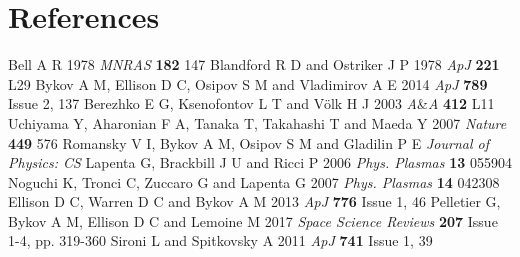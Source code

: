 \section*{References}
\begin{thebibliography}{20}
 Bell A R 1978 \textit{MNRAS} \textbf{182} 147
 Blandford R D and Ostriker J P 1978 \textit{ApJ} \textbf{221} L29 
 Bykov A M, Ellison D C, Osipov S M and Vladimirov A E 2014 \textit{ApJ} \textbf{789} Issue 2, 137
 Berezhko E G, Ksenofontov L T and V{\"o}lk H J  2003 \textit{A}{\&}\textit{A} \textbf{412} L11
 Uchiyama Y, Aharonian F A, Tanaka T, Takahashi T and Maeda Y 2007 \textit{Nature} \textbf{449} 576
 Romansky V I, Bykov A M, Osipov S M and Gladilin P E \textit{Journal of Physics: CS}
 Lapenta G, Brackbill J U and Ricci P 2006 \textit{Phys. Plasmas} \textbf{13} 055904
 Noguchi K, Tronci C, Zuccaro G and Lapenta G 2007 \textit{Phys. Plasmas} \textbf{14} 042308
 Ellison D C, Warren D C and Bykov A M 2013 \textit{ApJ} \textbf{776} Issue 1, 46
 Pelletier G, Bykov A M, Ellison D C and Lemoine M 2017 \textit{Space Science Reviews} \textbf{207} Issue 1-4, pp. 319-360
 Sironi L and Spitkovsky A 2011 \textit{ApJ} \textbf{741} Issue 1, 39
\end{thebibliography}
